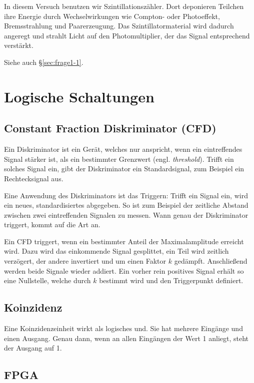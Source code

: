 \documentclass[11pt, ngerman, fleqn, DIV=15, headinclude, BCOR=2cm]{scrreprt}
\begin{document}
In diesem Versuch benutzen wir Szintillationszähler. Dort deponieren Teilchen
ihre Energie durch Wechselwirkungen wie Compton- oder Photoeffekt,
Bremsstrahlung und Paarerzeugung. Das Szintillatormaterial wird dadurch
angeregt und strahlt Licht auf den Photomultiplier, der das Signal entsprechend
verstärkt.

Siehe auch §\ref{sec:frage1-1}.

\section{Logische Schaltungen}

\subsection{Constant Fraction Diskriminator (CFD)}

Ein Diskriminator ist ein Gerät, welches nur anspricht, wenn ein eintreffendes
Signal stärker ist, als ein bestimmter Grenzwert (engl. \emph{threshold}).
Trifft ein solches Signal ein, gibt der Diskriminator ein Standardsignal, zum
Beispiel ein Rechtecksignal aus.

Eine Anwendung des Diskriminators ist das Triggern: Trifft ein Signal ein, wird
ein neues, standardisiertes abgegeben. So ist zum Beispiel der zeitliche
Abstand zwischen zwei eintreffenden Signalen zu messen. Wann genau der
Diskriminator triggert, kommt auf die Art an.

Ein CFD triggert, wenn ein bestimmter Anteil der Maximalamplitude erreicht
wird. Dazu wird das einkommende Signal gesplittet, ein Teil wird zeitlich
verzögert, der andere invertiert und um einen Faktor $k$ gedämpft. Anschließend
werden beide Signale wieder addiert. Ein vorher rein positives Signal erhält so
eine Nullstelle, welche durch $k$ bestimmt wird und den Triggerpunkt definiert.

\parencite{Ueding/525}

\subsection{Koinzidenz}

Eine Koinzidenzeinheit wirkt als logisches und. Sie hat mehrere Eingänge und
einen Ausgang. Genau dann, wenn an allen Eingängen der Wert 1 anliegt, steht
der Ausgang auf 1.

\subsection{FPGA}
\end{document}

